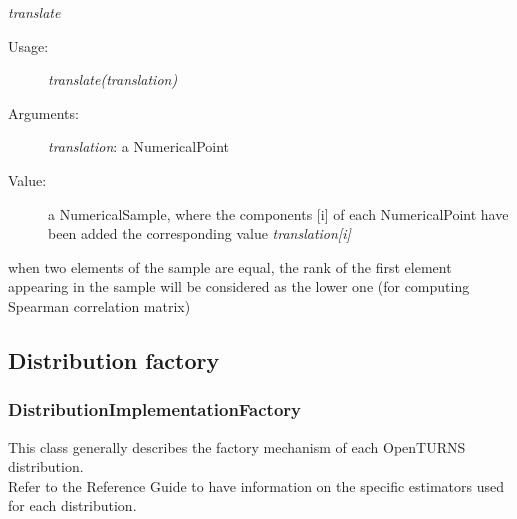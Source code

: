 \begin{description}
\begin{description}
\item \textit{translate}
\begin{description}
\item[Usage:] \textit{translate(translation)}
\item[Arguments:] \textit{translation}: a NumericalPoint
\item[Value:] a NumericalSample, where the components [i] of each NumericalPoint have been added the corresponding value \textit{translation[i]}
\end{description}

\end{description}

\item[Details:] \rule{0pt}{1em}
\begin{description}
\item when two elements of the sample are equal, the rank of the first element appearing in the sample
will be considered as the lower one (for computing Spearman correlation matrix)
\end{description}

\end{description}


\newpage
\subsection{Distribution factory}
\subsubsection{DistributionImplementationFactory}

This class generally describes the factory mechanism of each OpenTURNS distribution. \\
Refer to the Reference Guide to have information on the specific estimators used for each distribution.

